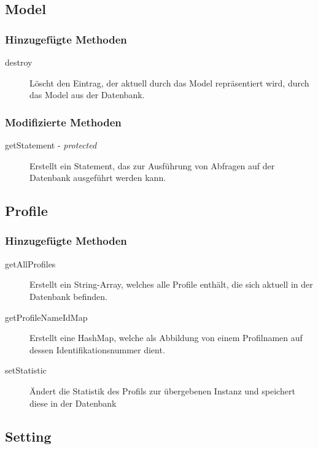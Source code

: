 \documentclass[parskip=full]{scrreprt}
\begin{document}
\subsection{Model}

\subsubsection{Hinzugefügte Methoden}
\begin{description}
	\item[destroy] Löscht den Eintrag, der aktuell durch das Model repräsentiert wird, durch das Model aus der Datenbank.
\end{description}

\subsubsection{Modifizierte Methoden}
\begin{description}
	\item[getStatement - \textit{protected}] Erstellt ein Statement, das zur Ausführung von Abfragen auf der Datenbank ausgeführt werden kann.
\end{description}

\subsection{Profile}

\subsubsection{Hinzugefügte Methoden}
\begin{description}
	\item[getAllProfiles] Erstellt ein String-Array, welches alle Profile enthält, die sich aktuell in der Datenbank befinden.
	\item[getProfileNameIdMap] Erstellt eine HashMap, welche als Abbildung von einem Profilnamen auf dessen Identifikationsnummer dient.
	\item[setStatistic] Ändert die Statistik des Profils zur übergebenen Instanz und speichert diese in der Datenbank
	
\end{description}

\subsection{Setting}
\end{document}
